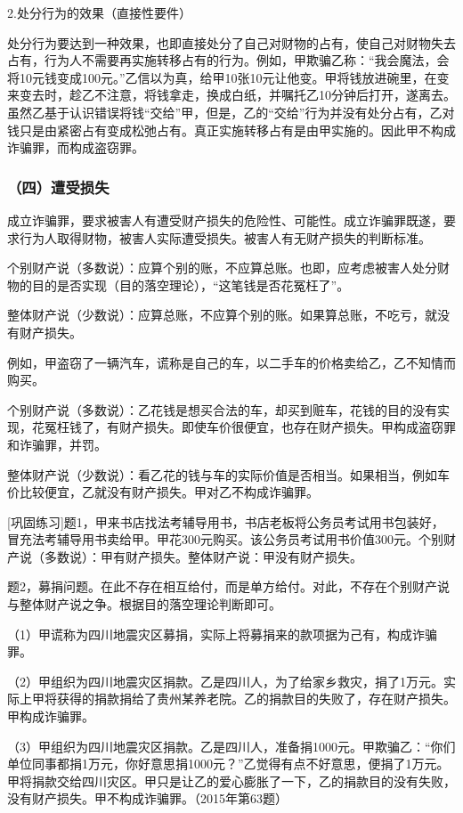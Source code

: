 2.处分行为的效果（直接性要件）

处分行为要达到一种效果，也即直接处分了自己对财物的占有，使自己对财物失去占有，行为人不需要再实施转移占有的行为。例如，甲欺骗乙称：“我会魔法，会将10元钱变成100元。”乙信以为真，给甲10张10元让他变。甲将钱放进碗里，在变来变去时，趁乙不注意，将钱拿走，换成白纸，并嘱托乙10分钟后打开，遂离去。虽然乙基于认识错误将钱“交给”甲，但是，乙的“交给”行为并没有处分占有，乙对钱只是由紧密占有变成松弛占有。真正实施转移占有是由甲实施的。因此甲不构成诈骗罪，而构成盗窃罪。

\subsubsection*{（四）遭受损失}

成立诈骗罪，要求被害人有遭受财产损失的危险性、可能性。成立诈骗罪既遂，要求行为人取得财物，被害人实际遭受损失。被害人有无财产损失的判断标准。

个别财产说（多数说）：应算个别的账，不应算总账。也即，应考虑被害人处分财物的目的是否实现（目的落空理论），“这笔钱是否花冤枉了”。

整体财产说（少数说）：应算总账，不应算个别的账。如果算总账，不吃亏，就没有财产损失。

例如，甲盗窃了一辆汽车，谎称是自己的车，以二手车的价格卖给乙，乙不知情而购买。

个别财产说（多数说）：乙花钱是想买合法的车，却买到赃车，花钱的目的没有实现，花冤枉钱了，有财产损失。即使车价很便宜，也存在财产损失。甲构成盗窃罪和诈骗罪，并罚。

整体财产说（少数说）：看乙花的钱与车的实际价值是否相当。如果相当，例如车价比较便宜，乙就没有财产损失。甲对乙不构成诈骗罪。

[巩固练习]题1，甲来书店找法考辅导用书，书店老板将公务员考试用书包装好，冒充法考辅导用书卖给甲。甲花300元购买。该公务员考试用书价值300元。个别财产说（多数说）：甲有财产损失。整体财产说：甲没有财产损失。

题2，募捐问题。在此不存在相互给付，而是单方给付。对此，不存在个别财产说与整体财产说之争。根据目的落空理论判断即可。

（1）甲谎称为四川地震灾区募捐，实际上将募捐来的款项据为己有，构成诈骗罪。

（2）甲组织为四川地震灾区捐款。乙是四川人，为了给家乡救灾，捐了1万元。实际上甲将获得的捐款捐给了贵州某养老院。乙的捐款目的失败了，存在财产损失。甲构成诈骗罪。

（3）甲组织为四川地震灾区捐款。乙是四川人，准备捐1000元。甲欺骗乙：“你们单位同事都捐1万元，你好意思捐1000元？”乙觉得有点不好意思，便捐了1万元。甲将捐款交给四川灾区。甲只是让乙的爱心膨胀了一下，乙的捐款目的没有失败，没有财产损失。甲不构成诈骗罪。（2015年第63题）

